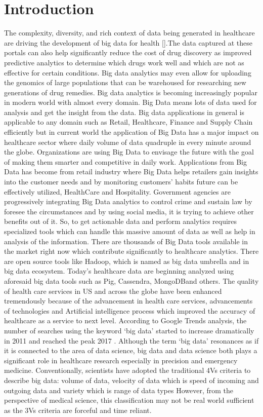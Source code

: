 \documentclass[sigconf]{acmart}
\begin{document}
\section{Introduction}
The complexity, diversity, and rich context of data being generated in healthcare
are driving the development of big data for health [\cite{editor02}].The data captured at these portals can also help significantly reduce the cost of drug discovery as improved predictive analytics to determine which drugs work well and which are not as effective for certain conditions. Big data analytics may even allow for uploading the genomics of large populations that can be warehoused for researching new generations of drug remedies. Big data analytics is becoming increasingly popular in modern world with almost every domain. Big Data means lots of data used for analysis and get the insight from the data. Big data applications in general is applicable to any domain such as Retail, Healthcare, Finance and Supply Chain efficiently but in current world the application of Big Data has a major impact on healthcare sector where daily volume of data quadruple in every minute around the globe. Organizations are using Big Data to envisage the future with the goal of making them smarter and competitive in daily work. Applications from Big Data has become from retail industry where Big Data helps retailers gain insights into the customer needs and by monitoring customers’ habits future can be effectively utilized, HealthCare and Hospitality\cite{editor02}. Government agencies are progressively integrating Big Data analytics to control crime and sustain law by foresee the circumstances and by using social media, it is trying to achieve other benefits out of it. So, to get actionable data and perform analytics requires specialized tools which can handle this massive amount of data as well as help in analysis of the information. There are thousands of Big Data tools available in the market right now which contribute significantly to healthcare analytics. There are open source tools like Hadoop, which is named as big data umbrella and in big data ecosystem. Today’s healthcare data are beginning analyzed using aforesaid big data tools such as Pig, Cassendra, MongoDBand others. The quality of health care services in US and across the globe have been enhanced tremendously because of the advancement in health care services, advancements of technologies and Artificial intelligence process which improved the accuracy of healthcare as a service to next level. According to Google Trends analysis, the number of searches using the keyword ‘big data’ started to increase dramatically in 2011 and reached the peak 2017 \cite{editor02}. Although the term ‘big data’ resonances as if it is connected to the area of data science,  big data and data science both plays a significant role in healthcare research especially in precision and emergency medicine. Conventionally, scientists have adopted the traditional 4Vs criteria to describe big data: volume of data, velocity of data which is speed of incoming and outgoing data and variety which is range of data types \cite{editor03} However, from the perspective of medical science, this classification may not be real world sufficient as the 3Vs criteria are forceful and time reliant.
\end{document}
